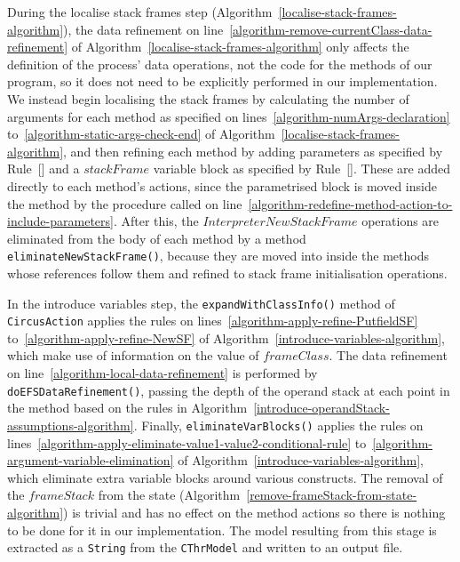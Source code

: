 During the localise stack frames step
(Algorithm~\ref{localise-stack-frames-algorithm}), the data refinement
on line~\ref{algorithm-remove-currentClass-data-refinement} of
Algorithm~\ref{localise-stack-frames-algorithm} only affects the
definition of the process' data operations, not the \Circus{} code for
the methods of our program, so it does not need to be explicitly
performed in our implementation.
We instead begin localising the stack frames by calculating the number
of arguments for each method as specified on
lines~\ref{algorithm-numArgs-declaration}
to~\ref{algorithm-static-args-check-end} of
Algorithm~\ref{localise-stack-frames-algorithm}, and then refining
each method by adding parameters as specified by
Rule~[] and a $stackFrame$
variable block as specified by
Rule~[].
These are added directly to each method's actions, since the
parametrised block is moved inside the method by the procedure called
on line~\ref{algorithm-redefine-method-action-to-include-parameters}.
After this, the $InterpreterNewStackFrame$ operations are eliminated
from the body of each method by a method
\texttt{eliminateNewStackFrame()}, because they are moved into inside
the methods whose references follow them and refined to stack frame
initialisation operations.

In the introduce variables step, the \texttt{expandWithClassInfo()}
method of \texttt{CircusAction} applies the rules on
lines~\ref{algorithm-apply-refine-PutfieldSF}
to~\ref{algorithm-apply-refine-NewSF} of
Algorithm~\ref{introduce-variables-algorithm}, which make use of
information on the value of $frameClass$.
The data refinement on line~\ref{algorithm-local-data-refinement} is
performed by \texttt{doEFSDataRefinement()}, passing the depth of the
operand stack at each point in the method based on the rules in
Algorithm~\ref{introduce-operandStack-assumptions-algorithm}.
Finally, \texttt{eliminateVarBlocks()} applies the rules on
lines~\ref{algorithm-apply-eliminate-value1-value2-conditional-rule}
to~\ref{algorithm-argument-variable-elimination} of
Algorithm~\ref{introduce-variables-algorithm}, which eliminate extra
variable blocks around various constructs.
The removal of the $frameStack$ from the state
(Algorithm~\ref{remove-frameStack-from-state-algorithm}) is trivial
and has no effect on the method actions so there is nothing to be done
for it in our implementation.
The \Circus{} model resulting from this stage is extracted as a
\texttt{String} from the \texttt{CThrModel} and written to an output
file.

